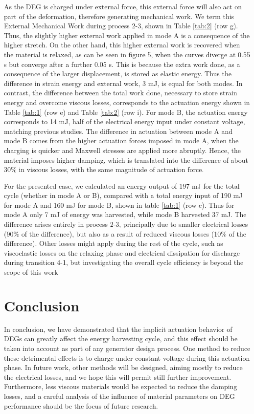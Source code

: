 As the DEG is charged under external force, this external force will also act on part of the deformation, therefore generating mechanical work. We term this External Mechanical Work during process 2-3, shown in Table \ref{tab:2} (row g). Thus, the slightly higher external work applied in mode A is a consequence of the higher stretch. On the other hand, this higher external work is recovered when the material is relaxed, as can be seen in figure 5, when the curves diverge at 0.55 s but converge after a further 0.05 s. This is because the extra work done, as a consequence of the larger displacement, is stored as elastic energy. Thus the difference in strain energy and external work, 3 mJ, is equal for both modes.
In contrast, the difference between the total work done, necessary to store strain energy and overcome viscous losses, corresponds to the actuation energy shown in Table \ref{tab:1} (row e) and Table \ref{tab:2} (row i). For mode B, the actuation energy corresponds to 14 mJ, half of the electrical energy input under constant voltage, matching previous studies\cite{RN43}. The difference in actuation between mode A and mode B comes from the higher actuation forces imposed in mode A, when the charging is quicker and Maxwell stresses are applied more abruptly. Hence, the material imposes higher damping, which is translated into the difference of about 30\% in viscous losses, with the same magnitude of actuation force. 

For the presented case, we calculated an energy output of 197 mJ for the total cycle (whether in mode A or B), compared with a total energy input of 190 mJ for mode A and 160 mJ for mode B, shown in table \ref{tab:1} (row c). Thus for mode A only 7 mJ of energy was harvested, while mode B harvested 37 mJ. The difference arises entirely in process 2-3, principally due to smaller electrical losses (90\% of the difference), but also as a result of reduced viscous losses (10\% of the difference). Other losses might apply during the rest of the cycle, such as viscoelastic losses on the relaxing phase and electrical dissipation for discharge during transition 4-1, but investigating the overall cycle efficiency is beyond the scope of this work

\section{Conclusion}
\label{sec:conclusion}
In conclusion, we have demonstrated that the implicit actuation behavior of DEGs can greatly affect the energy harvesting cycle, and this effect should be taken into account as part of any generator design process. One method to reduce these detrimental effects is to charge under constant voltage during this actuation phase. In future work, other methods will be designed, aiming mostly to reduce the electrical losses, and we hope this will permit still further improvement. Furthermore, less viscous materials would be expected to reduce the damping losses, and a careful analysis of the influence of material parameters on DEG performance should be the focus of future research.






